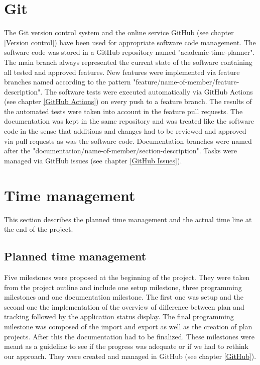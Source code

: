\section{Git}
The Git version control system and the online service GitHub (see chapter \ref{Version control}) have been used for appropriate software code management. The software code was stored in a GitHub repository named "academic-time-planner". The main branch always represented the current state of the software containing all tested and approved features. New features were implemented via feature branches named according to the pattern "feature/name-of-member/feature-description". The software tests were executed automatically via GitHub Actions (see chapter \ref{GitHub Actions}) on every push to a feature branch. The results of the automated tests were taken into account in the feature pull requests. The documentation was kept in the same repository and was treated like the software code in the sense that additions and changes had to be reviewed and approved via pull requests as was the software code. Documentation branches were named after the "documentation/name-of-member/section-description". Tasks were managed via GitHub issues (see chapter \ref{GitHub Issues}).

\section{Time management} \label{Time management}
This section describes the planned time management and the actual time line at the end of the project.
\subsection{Planned time management}
Five milestones were proposed at the beginning of the project. They were taken from the project outline and include one setup milestone, three programming milestones and one documentation milestone. The first one was setup and the second one the implementation of the overview of difference between plan and tracking followed by the application status display. The final programming milestone was composed of the import and export as well as the creation of plan projects. After this the documentation had to be finalized. These milestones were meant as a guideline to see if the progress was adequate or if we had to rethink our approach. They were created and managed in GitHub (see chapter \ref{GitHub}). 
